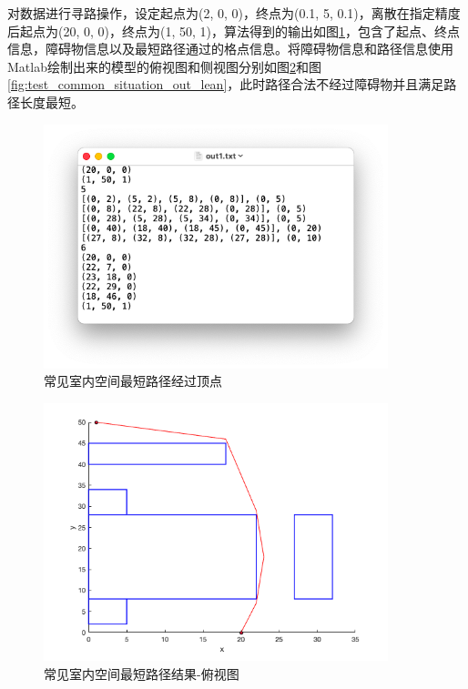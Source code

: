 对数据进行寻路操作，设定起点为(2, 0, 0)，终点为(0.1, 5, 0.1)，离散在指定精度后起点为(20, 0, 0)，终点为(1, 50, 1)，算法得到的输出如图\ref{fig:test_common_situation_out}，包含了起点、终点信息，障碍物信息以及最短路径通过的格点信息。将障碍物信息和路径信息使用Matlab绘制出来的模型的俯视图和侧视图分别如图\ref{fig:test_common_situation_out_top}和图\ref{fig:test_common_situation_out_lean}，此时路径合法不经过障碍物并且满足路径长度最短。
\begin{figure}[!htb]
    \centering
    \includegraphics[width=10cm]{figures/test_common_situation_out.png}
    \caption{常见室内空间最短路径经过顶点}
    \label{fig:test_common_situation_out}
\end{figure}
\begin{figure}[!htb]
    \centering
    \includegraphics[width=10cm]{figures/test_common_situation_out_top.png}
    \caption{常见室内空间最短路径结果-俯视图}
    \label{fig:test_common_situation_out_top}
\end{figure}
